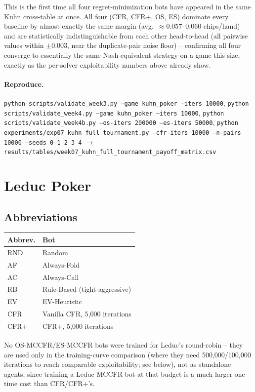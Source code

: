 \documentclass[11pt]{article}
\newcommand{\code}[1]{\texttt{#1}}
\begin{document}
This is the first time all four regret-minimization bots have appeared in the same
Kuhn cross-table at once. All four (CFR, CFR+, OS, ES) dominate every baseline by
almost exactly the same margin (avg.\ $\approx 0.057$--$0.060$ chips/hand) and are
statistically indistinguishable from each other head-to-head (all pairwise values
within $\pm 0.003$, near the duplicate-pair noise floor) -- confirming all four
converge to essentially the same Nash-equivalent strategy on a game this size, exactly
as the per-solver exploitability numbers above already show.

\paragraph{Reproduce.}
\code{python scripts/validate\_week3.py --game kuhn\_poker --iters 10000},
\code{python scripts/validate\_week4.py --game kuhn\_poker --iters 10000},
\code{python scripts/validate\_week4b.py --os-iters 200000 --es-iters 50000},
\code{python experiments/exp07\_kuhn\_full\_tournament.py --cfr-iters 10000 --n-pairs
10000 --seeds 0 1 2 3 4} $\rightarrow$
\code{results/tables/week07\_kuhn\_full\_tournament\_payoff\_matrix.csv}

\section{Leduc Poker}

\subsection*{Abbreviations}
\begin{center}
\begin{tabular}{ll}
\toprule
Abbrev. & Bot \\
\midrule
RND & Random \\
AF & Always-Fold \\
AC & Always-Call \\
RB & Rule-Based (tight-aggressive) \\
EV & EV-Heuristic \\
CFR & Vanilla CFR, 5{,}000 iterations \\
CFR+ & CFR+, 5{,}000 iterations \\
\bottomrule
\end{tabular}
\end{center}

No OS-MCCFR/ES-MCCFR bots were trained for Leduc's round-robin -- they are used only
in the training-curve comparison (where they need 500{,}000/100{,}000 iterations to
reach comparable exploitability; see below), not as standalone agents, since training
a Leduc MCCFR bot at that budget is a much larger one-time cost than CFR/CFR+'s.
\end{document}
